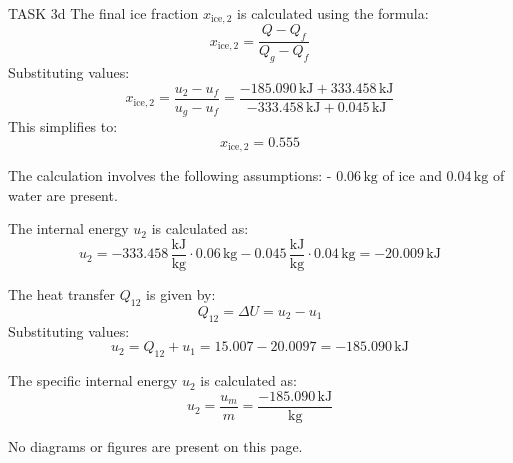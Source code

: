 TASK 3d  
The final ice fraction \( x_{\text{ice},2} \) is calculated using the formula:  
\[
x_{\text{ice},2} = \frac{Q - Q_f}{Q_g - Q_f}
\]  
Substituting values:  
\[
x_{\text{ice},2} = \frac{u_2 - u_f}{u_g - u_f} = \frac{-185.090 \, \text{kJ} + 333.458 \, \text{kJ}}{-333.458 \, \text{kJ} + 0.045 \, \text{kJ}}
\]  
This simplifies to:  
\[
x_{\text{ice},2} = 0.555
\]  

The calculation involves the following assumptions:  
- \( 0.06 \, \text{kg} \) of ice and \( 0.04 \, \text{kg} \) of water are present.  

The internal energy \( u_2 \) is calculated as:  
\[
u_2 = -333.458 \, \frac{\text{kJ}}{\text{kg}} \cdot 0.06 \, \text{kg} - 0.045 \, \frac{\text{kJ}}{\text{kg}} \cdot 0.04 \, \text{kg} = -20.009 \, \text{kJ}
\]  

The heat transfer \( Q_{12} \) is given by:  
\[
Q_{12} = \Delta U = u_2 - u_1
\]  
Substituting values:  
\[
u_2 = Q_{12} + u_1 = 15.007 - 20.0097 = -185.090 \, \text{kJ}
\]  

The specific internal energy \( u_2 \) is calculated as:  
\[
u_2 = \frac{u_m}{m} = \frac{-185.090 \, \text{kJ}}{\text{kg}}
\]  

No diagrams or figures are present on this page.